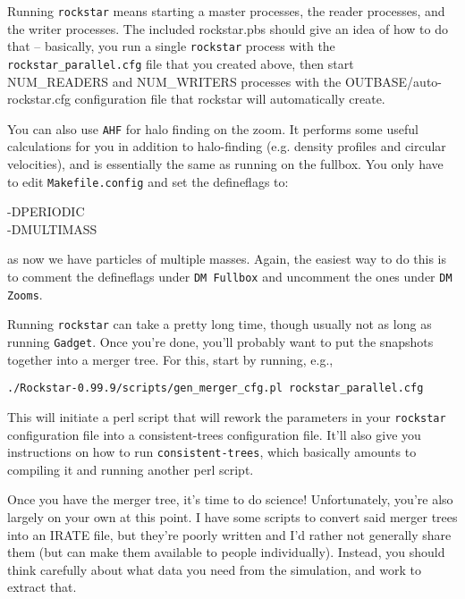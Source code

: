 \documentclass[10pt,a4paper,onecolumn]{article}
\begin{document}
Running \texttt{rockstar} means starting a master processes, the reader processes,
and the writer processes.  The included rockstar.pbs should give an
idea of how to do that -- basically, you run a single \texttt{rockstar} process
with the \texttt{rockstar\_parallel.cfg} file that you created above, then start
NUM\_READERS and NUM\_WRITERS processes with the
OUTBASE/auto-rockstar.cfg configuration file that rockstar will
automatically create.

You can also use \texttt{AHF} for halo finding on the zoom.  It performs some useful calculations for you in addition to halo-finding (e.g. density profiles and circular velocities), and is essentially the same as running on the fullbox.  You only have to edit \texttt{Makefile.config} and set the defineflags to:
\begin{description}
\item[-DPERIODIC]
\item[-DMULTIMASS]
\end{description}
as now we have particles of multiple masses.  Again, the easiest way to do this is to comment the defineflags under \texttt{DM Fullbox} and uncomment the ones under \texttt{DM Zooms}.

Running  \texttt{rockstar} can take a pretty long time, though usually not
as long as running \texttt{Gadget}.  Once you're done, you'll probably want 
to put the snapshots together into a merger tree.  For this, start by running, e.g.,
\begin{verbatim}
./Rockstar-0.99.9/scripts/gen_merger_cfg.pl rockstar_parallel.cfg
\end{verbatim}
This will initiate a perl script that will rework the parameters in 
your  \texttt{rockstar} configuration file into a consistent-trees configuration
file.  It'll also give you instructions on how to run \texttt{consistent-trees}, which
basically amounts to compiling it and running another perl
script.

Once you have the merger tree, it's time to do science!  Unfortunately, you're also
largely on your own at this point.  I have some scripts to convert said merger trees 
into an IRATE file, but they're poorly written and I'd rather not generally share them 
(but can make them available to people individually).  Instead, you should think
carefully about what data you need from the simulation, and work to extract that.
\end{document}

